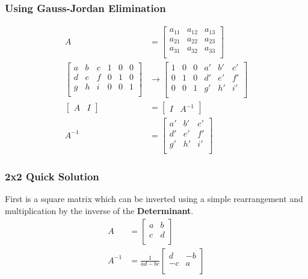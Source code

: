 \documentclass[]{article}
\begin{document}
\subsubsection{Using Gauss-Jordan Elimination}
	\begin{align*}
	A &= 
		\begin{bmatrix}
			a_{11} & a_{12} & a_{13} \\
			a_{21} & a_{22} & a_{23} \\
			a_{31} & a_{32} & a_{33} \\
		\end{bmatrix}
	\\
		\begin{bmatrix}
			a & b & c &1&0&0 \\
			d & e & f &0&1&0 \\
			g & h & i &0&0&1 \\
		\end{bmatrix}
	&\rightarrow
		\begin{bmatrix}
			1&0&0& a\prime & b\prime & c\prime  \\
			0&1&0& d\prime & e\prime & f\prime  \\
			0&0&1& g\prime & h\prime & i\prime  \\
		\end{bmatrix}
	\\
	\begin{bmatrix} A & I \end{bmatrix} 
	&=
	\begin{bmatrix} I & A^{-1} \end{bmatrix}
	\\
	A^{-1} &=
		\begin{bmatrix}
			a\prime & b\prime & c\prime  \\
			d\prime & e\prime & f\prime  \\
			g\prime & h\prime & i\prime  \\
		\end{bmatrix}
	\end{align*}

\subsubsection{2x2 Quick Solution}
First is a square matrix which can be inverted using a simple rearrangement and multiplication by the inverse of the \textbf{Determinant}.
	\begin{align*}
		A &= 
			\begin{bmatrix}
				a & b \\
				c & d \\
			\end{bmatrix}
		\\
		A^{-1} &= 
			\frac{1}{ad - bc}
			\begin{bmatrix}
				 d &-b \\
				-c & a \\
			\end{bmatrix}
	\end{align*}
\end{document}
